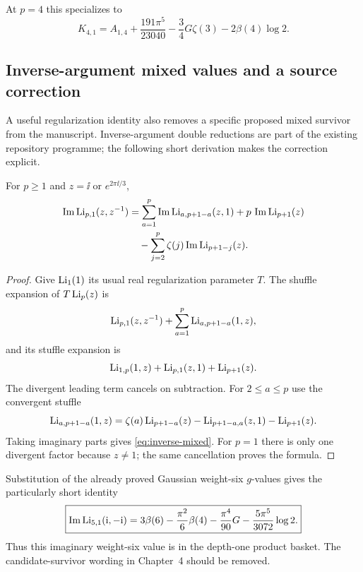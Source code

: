 At \(p=4\) this specializes to
\begin{equation}\label{eq:K41}
 K_{4,1}=A_{1,4}+\frac{191\pi^5}{23040}
                  -\frac34G\zeta(3)-2\beta(4)\log2.
\end{equation}

\subsection{Inverse-argument mixed values and a source correction}

A useful regularization identity also removes a specific proposed
mixed survivor from the manuscript. Inverse-argument double reductions
are part of the existing repository programme; the following short
derivation makes the correction explicit.

\begin{proposition}\label{prop:inverse-mixed}
For \(p\geq1\) and \(z=\ii\) or \(e^{2\pi\ii/3}\),
\begin{align}
 \operatorname{Im}\operatorname{Li}_{p,1}(z,z^{-1})
 &=\sum_{a=1}^{p}\operatorname{Im}\operatorname{Li}_{a,p+1-a}(z,1)
     +p\,\operatorname{Im}\operatorname{Li}_{p+1}(z)\notag\\
 &\quad-\sum_{j=2}^{p}\zeta(j)\operatorname{Im}\operatorname{Li}_{p+1-j}(z).
 \label{eq:inverse-mixed}
\end{align}
\end{proposition}

\begin{proof}
Give \(\operatorname{Li}_1(1)\) its usual real regularization parameter \(T\).
The shuffle expansion of \(T\operatorname{Li}_p(z)\) is
\[
 \operatorname{Li}_{p,1}(z,z^{-1})+\sum_{a=1}^{p}\operatorname{Li}_{a,p+1-a}(1,z),
\]
and its stuffle expansion is
\[
 \operatorname{Li}_{1,p}(1,z)+\operatorname{Li}_{p,1}(z,1)+\operatorname{Li}_{p+1}(z).
\]
The divergent leading term cancels on subtraction. For \(2\leq a\leq p\)
use the convergent stuffle
\[
 \operatorname{Li}_{a,p+1-a}(1,z)
 =\zeta(a)\operatorname{Li}_{p+1-a}(z)
       -\operatorname{Li}_{p+1-a,a}(z,1)-\operatorname{Li}_{p+1}(z).
\]
Taking imaginary parts gives \eqref{eq:inverse-mixed}.
For \(p=1\) there is only one divergent factor because \(z\ne1\);
the same cancellation proves the formula.
\end{proof}

Substitution of the already proved Gaussian weight-six \(g\)-values
gives the particularly short identity
\begin{equation}\label{eq:mixed-weight-six}
 \boxed{\displaystyle
 \operatorname{Im}\operatorname{Li}_{5,1}(\mathrm{i},-\mathrm{i})
 =3\beta(6)-\frac{\pi^2}{6}\beta(4)
            -\frac{\pi^4}{90}G-\frac{5\pi^5}{3072}\log2.}
\end{equation}
Thus this imaginary weight-six value is in the depth-one product
basket. The candidate-survivor wording in Chapter~4 should be removed.


